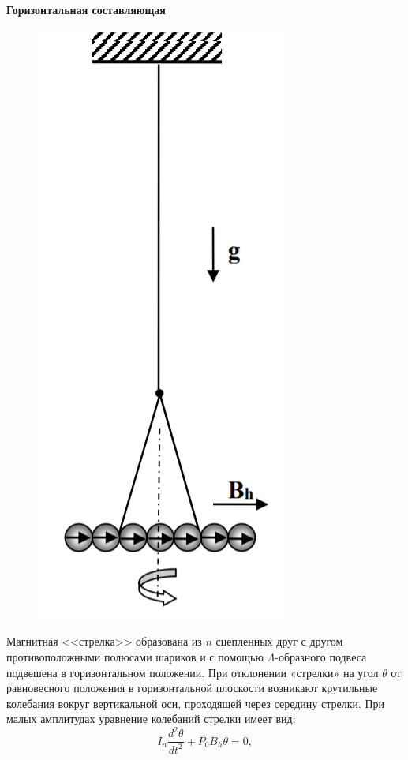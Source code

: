 \paragraph*{Горизонтальная составляющая}
\begin{figure}
\includegraphics[scale=0.5]{1.png}
\vspace{-40pt}
\end{figure}\n
Магнитная <<стрелка>> образована из $n$ сцепленных друг с другом противоположными полюсами шариков и с помощью $\Lambda$-образного подвеса подвешена в горизонтальном положении. При отклонении «стрелки» на угол $\theta$ от равновесного положения в горизонтальной плоскости возникают крутильные колебания вокруг вертикальной оси, проходящей через середину стрелки. При малых амплитудах уравнение колебаний
стрелки имеет вид:
$$
I_n \dfrac{d^2 \theta}{dt^2} + P_0 B_h \theta = 0,
$$
